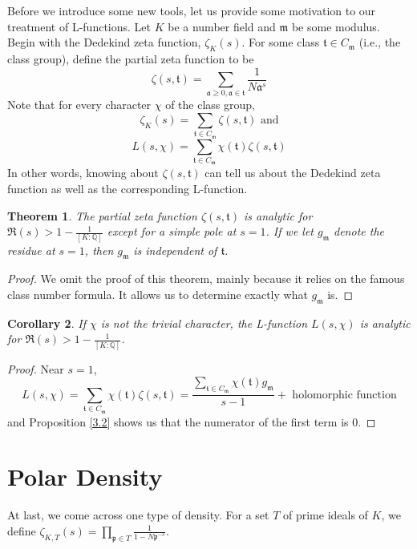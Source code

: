 \documentclass{article}
\newcommand{\QQ}{\mathbb{Q}}
\theoremstyle{plain}
\newtheorem{thm}{Theorem}
\newtheorem{cor}[thm]{Corollary}
\theoremstyle{definition}
\theoremstyle{remark}
\numberwithin{equation}{section}
\numberwithin{thm}{section}
\begin{document}
Before we introduce some new tools, let us provide some motivation to our treatment of L-functions. Let $K$ be a number field and $\mathfrak{m}$ be some modulus. Begin with the Dedekind zeta function, $\zeta_{K}(s)$. For some class $\mathfrak{t} \in C_{\mathfrak{m}}$ (i.e., the class group), define the partial zeta function to be $$\zeta(s, \mathfrak{t}) = \sum_{\mathfrak{a} \ge 0, \mathfrak{a} \in \mathfrak{t}} \frac{1}{N\mathfrak{a}^s}$$ Note that for every character $\chi$ of the class group, $$\zeta_{K}(s) = \sum_{\mathfrak{t} \in C_{\mathfrak{m}}} \zeta(s, \mathfrak{t}) \text{ and}$$ $$L(s, \chi) = \sum_{\mathfrak{t} \in C_{\mathfrak{m}}} \chi(\mathfrak{t})\zeta(s, \mathfrak{t})$$ In other words, knowing about $\zeta(s, \mathfrak{t})$ can tell us about the Dedekind zeta function as well as the corresponding L-function. 

\begin{thm}
The partial zeta function $\zeta(s, \mathfrak{t})$ is analytic for $\Re(s) > 1 - \frac{1}{[K : \QQ]}$ except for a simple pole at $s = 1$. If we let $g_{\mathfrak{m}}$ denote the residue at $s = 1$, then $g_{\mathfrak{m}}$ is independent of $\mathfrak{t}$.
\end{thm}

\begin{proof}
We omit the proof of this theorem, mainly because it relies on the famous class number formula. It allows us to determine exactly what $g_{\mathfrak{m}}$ is. 
\end{proof}

\begin{cor}
If $\chi$ is not the trivial character, the L-function $L(s, \chi)$ is analytic for $\Re(s) > 1 - \frac{1}{[K : \QQ]}$.
\end{cor}

\begin{proof}
Near $s = 1$, $$L(s, \chi) = \sum_{\mathfrak{t} \in C_{\mathfrak{m}}} \chi(\mathfrak{t})\zeta(s, \mathfrak{t}) = \frac{\sum_{\mathfrak{t} \in C_{\mathfrak{m}}} \chi(\mathfrak{t})g_{\mathfrak{m}}}{s - 1} + \text{ holomorphic function}$$ and Proposition \ref{3.2} shows us that the numerator of the first term is $0$.
\end{proof}


\section{Polar Density}

At last, we come across one type of density. For a set $T$ of prime ideals of $K$, we define $\zeta_{K, T}(s) = \prod_{\mathfrak{p} \in T} \frac{1}{1 - N\mathfrak{p}^{-s}}$. 
\end{document}
